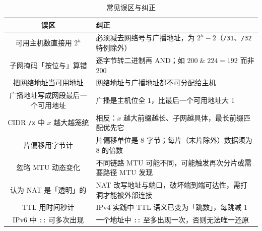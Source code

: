 \begin{table}[H]
\centering
\caption{常见误区与纠正}
\begin{tabulary}{\textwidth}{CL}
\toprule
误区 & 纠正 \\
\midrule
可用主机数直接用 $2^h$ & 必须减去网络号与广播地址，为 $2^h-2$（\texttt{/31}、\texttt{/32} 特例除外） \\
子网掩码「按位与」算错 & 逐字节转二进制再 AND；如 $200\;\&\;224=192$ 而非 $200$ \\
把网络地址当可用地址 & 网络地址与广播地址都不可分配给主机 \\
广播地址写成网段最后一个可用地址 & 广播是主机位全 1，比最后一个可用地址大 1 \\
CIDR \texttt{/x} 中 $x$ 越大越笼统 & 相反：$x$ 越大前缀越长、子网越具体，最长前缀匹配优先它 \\
片偏移用字节计 & 片偏移单位是 8 字节；每片（末片除外）数据须为 8 的倍数 \\
忽略 MTU 动态变化 & 不同链路 MTU 可能不同，可能触发再次分片或需要路径 MTU 发现 \\
认为 NAT 是「透明」的 & NAT 改写地址与端口，破坏端到端可达性，需打洞才能被外部连接 \\
TTL 用时间秒计 & IPv4 实践中 TTL 语义已变为「跳数」，每跳减 1 \\
IPv6 中 \texttt{::} 可多次出现 & 一个地址中 \texttt{::} 至多出现一次，否则无法唯一还原 \\
\bottomrule
\end{tabulary}
\end{table}
